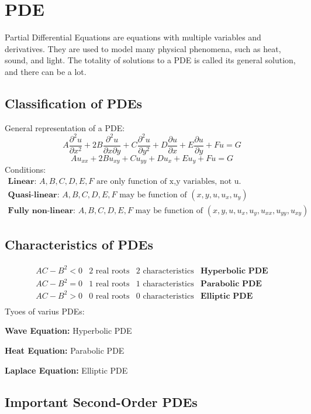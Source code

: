 \section{PDE}
Partial Differential Equations are equations with multiple variables and derivatives.
They are used to model many physical phenomena, such as heat, sound, and light.
The totality of solutions to a PDE is called its general solution, and there can be a lot.

\subsection{Classification of PDEs}
General representation of a PDE:
\[
  A\frac{\partial^2u}{\partial x^2}+2B\frac{\partial^2u}{\partial x\partial y}+C\frac{\partial^2u}{\partial y^2}+D\frac{\partial u}{\partial x}+E\frac{\partial u}{\partial y}+Fu=G
\]
\[
  Au_{xx}+2Bu_{xy}+Cu_{yy}+Du_x+Eu_y+Fu=G
\]
Conditions:
$$\begin{array}{l}
\textbf{Linear: }A,B,C,D,E,F \text{ are only function of x,y variables, not u.}\\
\textbf{Quasi-linear: }A,B,C,D,E,F \text{ may be function of } (x,y,u,u_x,u_y)\\
\textbf{Fully non-linear: }A,B,C,D,E,F \text{ may be function of } (x,y,u,u_x,u_y,u_{xx},u_{yy},u_{xy})
\end{array}$$

\subsection{Characteristics of PDEs}
$$\begin{array}{llll}
  AC-B^2<0&2\text{ real roots}&2\text{ characteristics}&\textbf{Hyperbolic PDE}\\
  AC-B^2=0&1\text{ real roots}&1\text{ characteristics}&\textbf{Parabolic PDE}\\
  AC-B^2>0&0\text{ real roots}&0\text{ characteristics}&\textbf{Elliptic PDE}\\
\end{array}$$
Tyoes of varius PDEs:

\textbf{Wave Equation:} Hyperbolic PDE

\textbf{Heat Equation:} Parabolic PDE

\textbf{Laplace Equation:} Elliptic PDE

\subsection{Important Second-Order PDEs}

